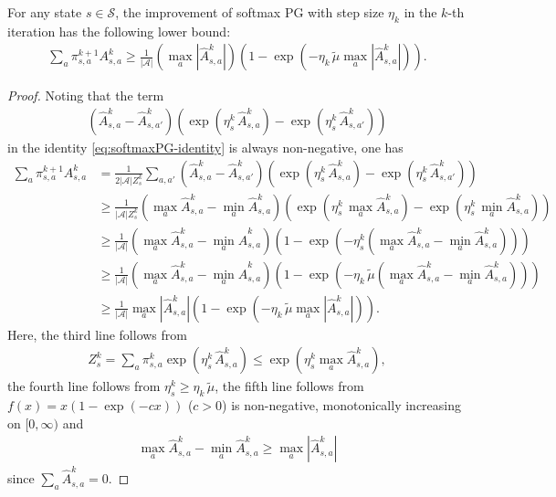 \begin{lemma}\label{lem:softmaxPG-improvement-lower}
    For any state $s\in\mathcal{S}$, the improvement of softmax PG with step size $\eta_k$ in the $k$-th iteration has the following lower bound:
    \begin{align*}
\sum_a\pi^{k+1}_{s,a}A^k_{s,a}\geq \frac{1}{|\mathcal{A}|}\left(\max_a|\hat{A}^k_{s,a}|\right)
\left(1-\exp\left(-\eta_k\,\tilde{\mu}\max_a|\hat{A}^k_{s,a}|\right)\right).
\end{align*}
\end{lemma}
\begin{proof}
    Noting that the term
\begin{align*}
\left(\hat{A}^k_{s,a}-\hat{A}^k_{s,a'}\right)\left(\exp\left(\eta_s^k\,\hat{A}^k_{s,a}\right)-\exp\left(\eta_s^k\,\hat{A}^k_{s,a'}\right)\right)
\end{align*}
in the identity \eqref{eq:softmaxPG-identity} is always non-negative, one has 
\begin{align*}
\sum_a\pi^{k+1}_{s,a}A^k_{s,a} &= \frac{1}{2|\mathcal{A}|Z_s^k}\sum_{a,a'}\left(\hat{A}^k_{s,a}-\hat{A}^k_{s,a'}\right)\left(\exp\left(\eta_s^k\,\hat{A}^k_{s,a}\right)-\exp\left(\eta_s^k\,\hat{A}^k_{s,a'}\right)\right)\\
&\geq  \frac{1}{|\mathcal{A}|Z_s^k}\left(\max_a\hat{A}^k_{s,a}-\min_a\hat{A}^k_{s,a}\right)\left(\exp\left(\eta_s^k\,\max_a\hat{A}^k_{s,a}\right)-\exp\left(\eta_s^k\,\min_a\hat{A}^k_{s,a}\right)\right)\\
&\geq \frac{1}{|\mathcal{A}|}\left(\max_a\hat{A}^k_{s,a}-\min_a\hat{A}^k_{s,a}\right)\left(1-\exp\left(-\eta_s^k\left(\max_a\hat{A}^k_{s,a}-\min_a\hat{A}^k_{s,a}\right)\right)\right)\\
&\geq \frac{1}{|\mathcal{A}|}\left(\max_a\hat{A}^k_{s,a}-\min_a\hat{A}^k_{s,a}\right)\left(1-\exp\left(-\eta_k\,\tilde{\mu}\left(\max_a\hat{A}^k_{s,a}-\min_a\hat{A}^k_{s,a}\right)\right)\right)\\
&\geq \frac{1}{|\mathcal{A}|}\max_a|\hat{A}^k_{s,a}|\left(1-\exp\left(-\eta_k\,\tilde{\mu}\max_a|\hat{A}^k_{s,a}|\right)\right).
\end{align*}
Here, the third line follows from 
\begin{align*}
Z_s^k=\sum_a \pi_{s,a}^k\exp\left(\eta_s^k\,\hat{A}^k_{s,a}\right)\leq \exp\left(\eta_s^k\max_a\hat{A}^k_{s,a}\right),
\end{align*}
the fourth line follows from $\eta_s^k\geq \eta_k\,\tilde{\mu}$, the fifth line follows from $f(x)=x(1-\exp(-cx))$  ($c>0$) is non-negative, monotonically increasing on $[0,\infty)$ and 
\begin{align*}
\max_a\hat{A}^k_{s,a}-\min_a\hat{A}^k_{s,a}\geq \max_a|\hat{A}^k_{s,a}|
\end{align*}
since $\sum_a\hat{A}^k_{s,a}=0$.
\end{proof}

